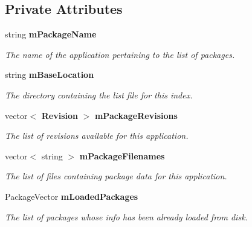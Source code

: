 \subsection*{Private Attributes}
\begin{DoxyCompactItemize}
\item 
string {\bf mPackageName}\label{classPackageIndex_a371cd31544ee7ee2dd94ea2cd6a5c83b}

\begin{DoxyCompactList}\small\item\em The name of the application pertaining to the list of packages. \item\end{DoxyCompactList}\item 
string {\bf mBaseLocation}\label{classPackageIndex_aa64023f614008a1232f96dfb99c900c5}

\begin{DoxyCompactList}\small\item\em The directory containing the list file for this index. \item\end{DoxyCompactList}\item 
vector$<$ {\bf Revision} $>$ {\bf mPackageRevisions}\label{classPackageIndex_ac038d851c5a331b56d0a89ac637fdf26}

\begin{DoxyCompactList}\small\item\em The list of revisions available for this application. \item\end{DoxyCompactList}\item 
vector$<$ string $>$ {\bf mPackageFilenames}\label{classPackageIndex_a0cc2fe3f2ecbdf6fd615771a7875cdef}

\begin{DoxyCompactList}\small\item\em The list of files containing package data for this application. \item\end{DoxyCompactList}\item 
PackageVector {\bf mLoadedPackages}\label{classPackageIndex_aa14b735bdad38ff880b4b18d91e4a55a}

\begin{DoxyCompactList}\small\item\em The list of packages whose info has been already loaded from disk. \item\end{DoxyCompactList}\end{DoxyCompactItemize}


